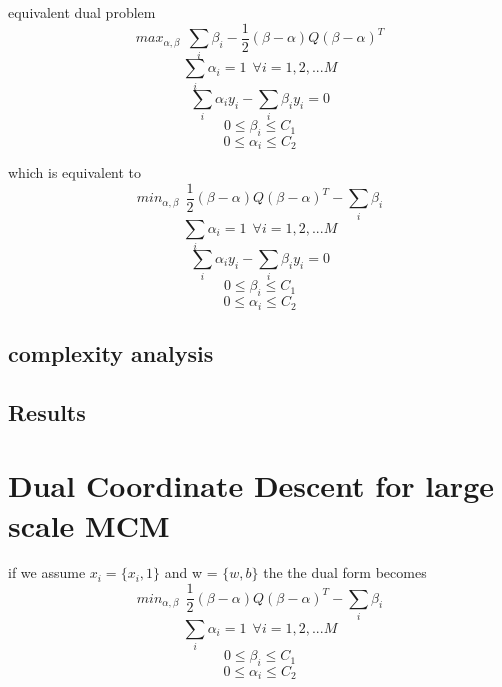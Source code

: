 equivalent dual problem
\begin{equation}\label{mcmeq1}
max_{\alpha,\beta}\:\: \sum_i{\beta_i} -  \frac{1}{2}(\beta - \alpha)Q(\beta - \alpha)^T
\end{equation}
\begin{equation}\label{mcmeq4}
\sum_i{\alpha_i} = 1 \:\:\forall i={1, 2, ... M}
\end{equation}
\begin{equation}
\sum_i{\alpha_iy_i} - \sum_i{\beta_iy_i} = 0
\end{equation}
\begin{equation}\label{mcmeq2}
0 \leq \beta_i \leq C_1
\end{equation}
\begin{equation}\label{mcmeq3}
0 \leq \alpha_i \leq C_2
\end{equation}

which is equivalent to
\begin{equation}\label{mcmeq1}
min_{\alpha,\beta}\:\: \frac{1}{2}(\beta - \alpha)Q(\beta - \alpha)^T - \sum_i{\beta_i}
\end{equation}
\begin{equation}\label{mcmeq4}
\sum_i{\alpha_i} = 1 \:\:\forall i={1, 2, ... M}
\end{equation}
\begin{equation}
\sum_i{\alpha_iy_i} - \sum_i{\beta_iy_i} = 0
\end{equation}
\begin{equation}\label{mcmeq2}
0 \leq \beta_i \leq C_1
\end{equation}
\begin{equation}\label{mcmeq3}
0 \leq \alpha_i \leq C_2
\end{equation}

\subsection{complexity analysis}
\subsection{Results}
\section{Dual Coordinate Descent for large scale MCM}
if we assume $x_i = \{x_i,1\}$ and w = $\{w ,b\}$
the the dual form becomes
\begin{equation}\label{mcmeq1}
min_{\alpha,\beta}\:\: \frac{1}{2}(\beta - \alpha)Q(\beta - \alpha)^T - \sum_i{\beta_i}
\end{equation}
\begin{equation}\label{mcmeq4}
\sum_i{\alpha_i} = 1 \:\:\forall i={1, 2, ... M}
\end{equation}
\begin{equation}\label{mcmeq2}
0 \leq \beta_i \leq C_1
\end{equation}
\begin{equation}\label{mcmeq3}
0 \leq \alpha_i \leq C_2
\end{equation}

